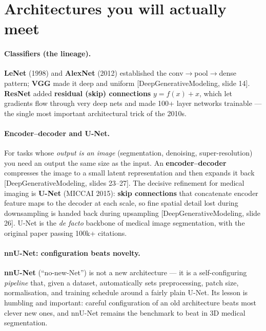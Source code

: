 \documentclass[11pt]{article}
\newcommand{\deck}[1]{\textsf{\small[#1]}}
\begin{document}
\section{Architectures you will actually meet}

\paragraph{Classifiers (the lineage).} \textbf{LeNet} (1998) and \textbf{AlexNet}
(2012) established the conv$\to$pool$\to$dense pattern; \textbf{VGG} made it deep
and uniform \deck{DeepGenerativeModeling, slide 14}. \textbf{ResNet} added
\textbf{residual (skip) connections} $y=f(x)+x$, which let gradients flow through
very deep nets and made 100+ layer networks trainable --- the single most
important architectural trick of the 2010s.

\paragraph{Encoder--decoder and U-Net.} For tasks whose \emph{output is an image}
(segmentation, denoising, super-resolution) you need an output the same size as
the input. An \textbf{encoder--decoder} compresses the image to a small latent
representation and then expands it back \deck{DeepGenerativeModeling, slides
23--27}. The decisive refinement for medical imaging is \textbf{U-Net} (MICCAI
2015): \textbf{skip connections} that concatenate encoder feature maps to the
decoder at each scale, so fine spatial detail lost during downsampling is handed
back during upsampling \deck{DeepGenerativeModeling, slide 26}. U-Net is the
\emph{de facto} backbone of medical image segmentation, with the original paper
passing 100k+ citations.

\paragraph{nnU-Net: configuration beats novelty.} \textbf{nnU-Net} (``no-new-Net'')
is not a new architecture --- it is a self-configuring \emph{pipeline} that, given
a dataset, automatically sets preprocessing, patch size, normalisation, and
training schedule around a fairly plain U-Net. Its lesson is humbling and
important: careful configuration of an old architecture beats most clever new
ones, and nnU-Net remains the benchmark to beat in 3D medical segmentation.
\end{document}

